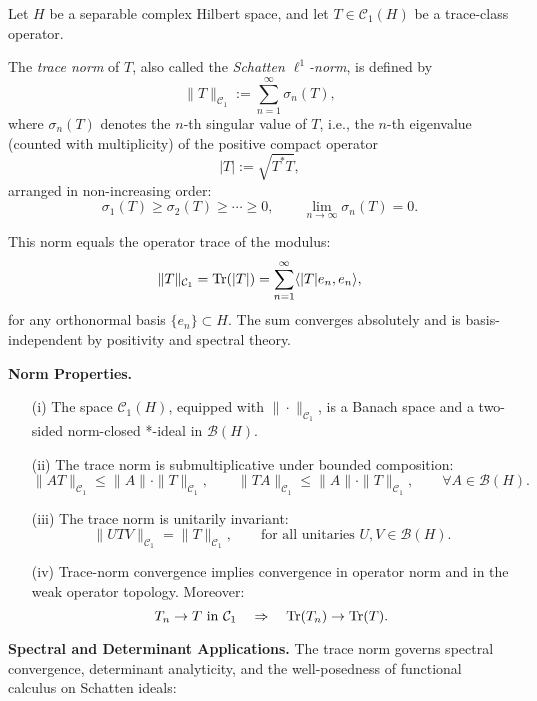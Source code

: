 \begin{definition}\label{def:trace_norm}
Let \( H \) be a separable complex Hilbert space, and let \( T \in \mathcal{C}_1(H) \) be a trace-class operator.

The \emph{trace norm} of \( T \), also called the \emph{Schatten \( \ell^1 \)-norm}, is defined by
\[
\| T \|_{\mathcal{C}_1} := \sum_{n=1}^\infty \sigma_n(T),
\]
where \( \sigma_n(T) \) denotes the \( n \)-th singular value of \( T \), i.e., the \( n \)-th eigenvalue (counted with multiplicity) of the positive compact operator
\[
|T| := \sqrt{T^* T},
\]
arranged in non-increasing order:
\[
\sigma_1(T) \ge \sigma_2(T) \ge \cdots \ge 0, \qquad \lim_{n \to \infty} \sigma_n(T) = 0.
\]

This norm equals the operator trace of the modulus:
\[
\| T \|_{\mathcal{C}_1} = \operatorname{Tr}(|T|) = \sum_{n=1}^\infty \langle |T| e_n, e_n \rangle,
\]
for any orthonormal basis \( \{ e_n \} \subset H \). The sum converges absolutely and is basis-independent by positivity and spectral theory.

\medskip
\noindent\textbf{Norm Properties.}
\begin{enumerate}
    \item[\textup{(i)}] The space \( \mathcal{C}_1(H) \), equipped with \( \| \cdot \|_{\mathcal{C}_1} \), is a Banach space and a two-sided norm-closed *-ideal in \( \mathcal{B}(H) \).
    
    \item[\textup{(ii)}] The trace norm is submultiplicative under bounded composition:
    \[
    \| A T \|_{\mathcal{C}_1} \le \|A\| \cdot \|T\|_{\mathcal{C}_1}, \qquad
    \| T A \|_{\mathcal{C}_1} \le \|A\| \cdot \|T\|_{\mathcal{C}_1}, \qquad \forall A \in \mathcal{B}(H).
    \]

    \item[\textup{(iii)}] The trace norm is unitarily invariant:
    \[
    \| U T V \|_{\mathcal{C}_1} = \|T\|_{\mathcal{C}_1}, \qquad \text{for all unitaries } U, V \in \mathcal{B}(H).
    \]

    \item[\textup{(iv)}] Trace-norm convergence implies convergence in operator norm and in the weak operator topology. Moreover:
    \[
    T_n \to T \text{ in } \mathcal{C}_1 \quad \Rightarrow \quad \operatorname{Tr}(T_n) \to \operatorname{Tr}(T).
    \]
\end{enumerate}

\medskip
\noindent\textbf{Spectral and Determinant Applications.}
The trace norm governs spectral convergence, determinant analyticity, and the well-posedness of functional calculus on Schatten ideals:


\end{definition}
